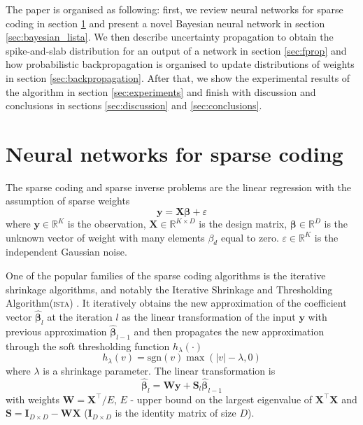 \documentclass[letterpaper]{article}
\begin{document}
The paper is organised as following: first, we review neural networks for sparse coding in section \ref{sec:nn_sc} and present a novel Bayesian neural network in section \ref{sec:bayesian_lista}. We then describe uncertainty propagation to obtain the spike-and-slab distribution for an output of a network in section \ref{sec:fprop} and how probabilistic backpropagation is organised to update distributions of weights in section \ref{sec:backpropagation}. After that, we show the experimental results of the algorithm in section \ref{sec:experiments} and finish with discussion and conclusions in sections \ref{sec:discussion} and \ref{sec:conclusions}.

\section{Neural networks for sparse coding}
\label{sec:nn_sc}
The sparse coding and sparse inverse problems are the linear regression with the assumption of sparse weights
\begin{equation}
\label{eq:regression_problem}
\mathbf{y} = \mathbf{X}\boldsymbol\beta + \varepsilon
\end{equation}
where $\mathbf{y} \in \mathbb{R}^K$ is the observation, $\mathbf{X} \in \mathbb{R}^{K \times D}$ is the design matrix, $\boldsymbol\beta \in \mathbb{R}^D$ is the unknown vector of weight with many elements $\beta_d$ equal to zero. $\varepsilon \in \mathbb{R}^K$ is the independent Gaussian noise.

One of the popular families of the sparse coding algorithms is the iterative shrinkage algorithms, and notably the Iterative Shrinkage and Thresholding Algorithm(\textsc{ista}) \citep{daubechies2004iterative}. It iteratively obtains the new approximation of the coefficient vector $\widehat{\boldsymbol\beta}_l$ at the iteration $l$ as the linear transformation of the input $\mathbf{y}$ with previous approximation $\widehat{\boldsymbol\beta}_{l-1}$ and then propagates the new approximation through the soft thresholding function $h_\lambda(\cdot)$
\begin{equation}
h_\lambda(v) = \text{sgn}(v) \max(|v| - \lambda, 0)
\end{equation}
where $\lambda$ is a shrinkage parameter.
The linear transformation is
\begin{equation}
\widehat{\boldsymbol\beta}_l = \mathbf{W}\mathbf{y} + \mathbf{S}_l\widehat{\boldsymbol\beta}_{l-1}
\end{equation}
with weights $\mathbf{W} = \mathbf{X}^\top / E$, $E$ - upper bound on the largest eigenvalue of $\mathbf{X}^\top\mathbf{X}$ and $\mathbf{S} = \mathbf{I}_{D \times D} - \mathbf{W}\mathbf{X}$ ($\mathbf{I}_{D \times D}$ is the identity matrix of size $D$).
\end{document}
